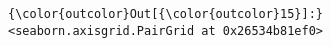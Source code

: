 \documentclass[11pt]{article}
\begin{document}
\begin{Verbatim}[commandchars=\\\{\}]
{\color{outcolor}Out[{\color{outcolor}15}]:} <seaborn.axisgrid.PairGrid at 0x26534b81ef0>
\end{Verbatim}
            
    \begin{center}
    \end{center}
    { \hspace*{\fill} \\}
    

    
    
    
    
\end{document}
